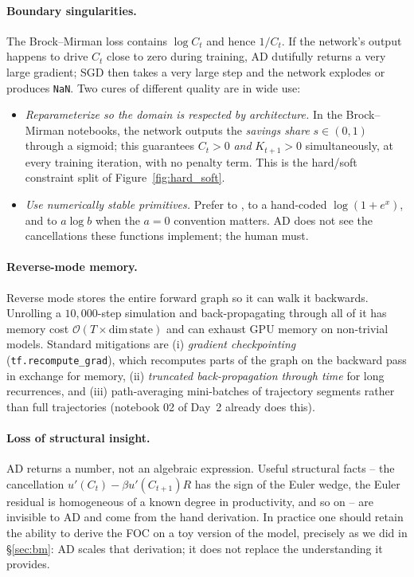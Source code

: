 \documentclass[11pt,a4paper]{report}
\begin{document}
\paragraph{Boundary singularities.}  The Brock--Mirman loss contains $\log C_t$ and hence $1/C_t$.  If the network's output happens to drive $C_t$ close to zero during training, AD dutifully returns a very large gradient; SGD then takes a very large step and the network explodes or produces \texttt{NaN}.  Two cures of different quality are in wide use:
\begin{itemize}[itemsep=2pt]
\item \emph{Reparameterize so the domain is respected by architecture.}  In the Brock--Mirman notebooks, the network outputs the \emph{savings share} $s \in (0,1)$ through a sigmoid; this guarantees $C_t > 0$ \emph{and} $K_{t+1} > 0$ simultaneously, at every training iteration, with no penalty term.  This is the hard/soft constraint split of Figure~\ref{fig:hard_soft}.
\item \emph{Use numerically stable primitives.}  Prefer  to ,  to a hand-coded $\log(1 + e^x)$, and  to $a\log b$ when the $a=0$ convention matters.  AD does not see the cancellations these functions implement; the human must.
\end{itemize}

\paragraph{Reverse-mode memory.}  Reverse mode stores the entire forward graph so it can walk it backwards.  Unrolling a $10{,}000$-step simulation and back-propagating through all of it has memory cost $\mathcal{O}(T \times \mathrm{dim}\,\text{state})$ and can exhaust GPU memory on non-trivial models.  Standard mitigations are (i) \emph{gradient checkpointing} (\texttt{tf.recompute\_grad}), which recomputes parts of the graph on the backward pass in exchange for memory, (ii) \emph{truncated back-propagation through time} for long recurrences, and (iii) path-averaging mini-batches of trajectory segments rather than full trajectories (notebook 02 of Day~2 already does this).

\paragraph{Loss of structural insight.}  AD returns a number, not an algebraic expression.  Useful structural facts -- the cancellation $u'(C_t) - \beta u'(C_{t+1}) R$ has the sign of the Euler wedge, the Euler residual is homogeneous of a known degree in productivity, and so on -- are invisible to AD and come from the hand derivation.  In practice one should retain the ability to derive the FOC on a toy version of the model, precisely as we did in \S\ref{sec:bm}: AD scales that derivation; it does not replace the understanding it provides.
\end{document}
